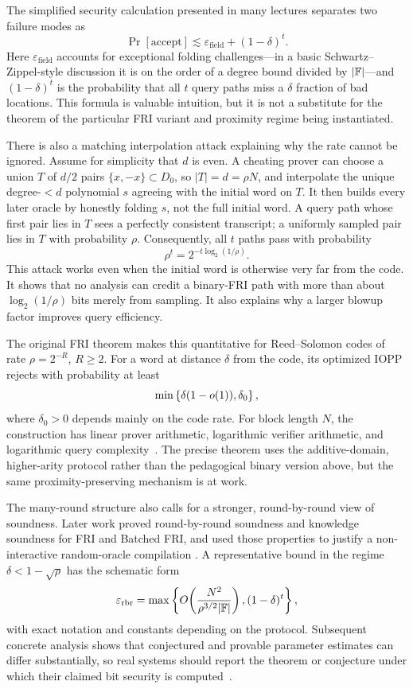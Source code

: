 The simplified security calculation presented in many lectures separates two failure modes as
\[
    \Pr[\text{accept}]
    \lesssim
    \varepsilon_{\mathrm{field}}+(1-\delta)^t.
\]
Here $\varepsilon_{\mathrm{field}}$ accounts for exceptional folding challenges---in a basic
Schwartz--Zippel-style discussion it is on the order of a degree bound divided by $|\mathbb{F}|$---and
$(1-\delta)^t$ is the probability that all $t$ query paths miss a $\delta$ fraction of bad
locations. This formula is valuable intuition, but it is not a substitute for the theorem of
the particular FRI variant and proximity regime being instantiated.

There is also a matching interpolation attack explaining why the rate cannot be ignored.
Assume for simplicity that $d$ is even. A cheating prover can choose a union $T$ of $d/2$
pairs $\{x,-x\}\subset D_0$, so $|T|=d=\rho N$, and interpolate the unique degree-$<d$
polynomial $s$ agreeing with the initial word on $T$. It then builds every later oracle by
honestly folding $s$, not the full initial word. A query path whose first pair lies in $T$
sees a perfectly consistent transcript; a uniformly sampled pair lies in $T$ with probability
$\rho$. Consequently, all $t$ paths pass with probability
\[
    \rho^t=2^{-t\log_2(1/\rho)}.
\]
This attack works even when the initial word is otherwise very far from the code. It shows that
no analysis can credit a binary-FRI path with more than about $\log_2(1/\rho)$ bits merely from
sampling. It also explains why a larger blowup factor improves query efficiency.

The original FRI theorem makes this quantitative for Reed--Solomon codes of rate
$\rho=2^{-R}$, $R\ge2$. For a word at distance $\delta$ from the code, its optimized IOPP
rejects with probability at least
\[
    \min\left\{\delta(1-o(1)),\delta_0\right\},
\]
where $\delta_0>0$ depends mainly on the code rate. For block length $N$, the construction
has linear prover arithmetic, logarithmic verifier arithmetic, and logarithmic query
complexity~\cite{BenSassonBentovHoreshRiabzev2018FRI}. The precise theorem uses the
additive-domain, higher-arity protocol rather than the pedagogical binary version above, but
the same proximity-preserving mechanism is at work.

The many-round structure also calls for a stronger, round-by-round view of soundness. Later work
proved round-by-round soundness and knowledge soundness for FRI and Batched FRI, and used those
properties to justify a non-interactive random-oracle compilation
\cite{BlockGarretaKatzThalerTiwariZajac2023FRIFS}. A representative bound in the regime
$\delta<1-\sqrt{\rho}$ has the schematic form
\[
    \varepsilon_{\mathrm{rbr}}
    =\max\left\{
      O\!\left(\frac{N^2}{\rho^{3/2}|\mathbb{F}|}\right),
      (1-\delta)^t
    \right\},
\]
with exact notation and constants depending on the protocol. Subsequent concrete analysis
shows that conjectured and provable parameter estimates can differ substantially, so real
systems should report the theorem or conjecture under which their claimed bit security is
computed~\cite{BlockTiwari2024ConcreteFRI}.

